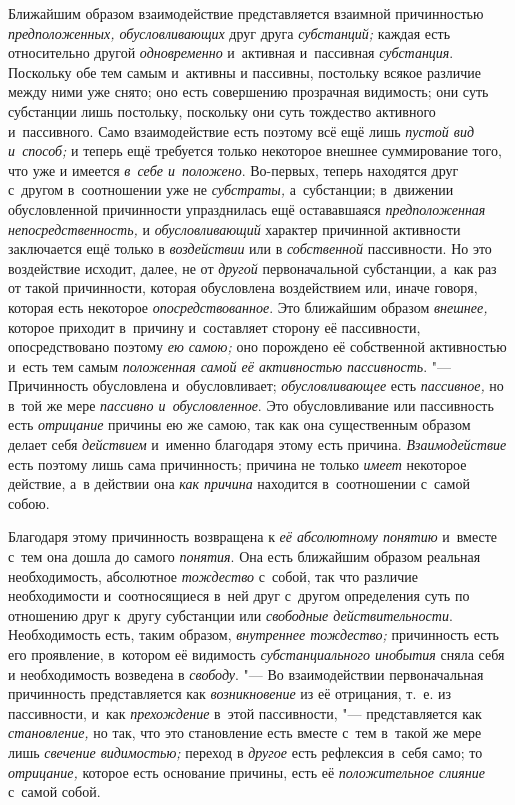 Ближайшим образом взаимодействие представляется взаимной причинностью
{\em предположенных, обусловливающих} друг друга
{\em субстанций;} каждая есть относительно другой
{\em одновременно} и~активная и~пассивная
{\em субстанция}. Поскольку обе тем самым и~активны и
пассивны, постольку всякое различие между ними уже снято; оно есть
совершению прозрачная видимость; они суть субстанции лишь постольку,
поскольку они суть тождество активного и~пассивного. Само взаимодействие
есть поэтому всё ещё лишь {\em пустой вид и~способ;} и
теперь ещё требуется только некоторое внешнее суммирование того, что уже и
имеется {\em в~себе и~положено}. Во-первых, теперь
находятся друг с~другом в~соотношении уже не
{\em субстраты,} а~субстанции; в~движении обусловленной
причинности упразднилась ещё остававшаяся
{\em предположенная непосредственность,} и
{\em обусловливающий} характер причинной активности
заключается ещё только в {\em воздействии} или в
{\em собственной} пассивности. Но это воздействие
исходит, далее, не от {\em другой} первоначальной
субстанции, а~как раз от такой причинности, которая обусловлена
воздействием или, иначе говоря, которая есть некоторое
{\em опосредствованное}. Это ближайшим образом
{\em внешнее,} которое приходит в~причину и~составляет
сторону её пассивности, опосредствовано поэтому {\em ею
самою;} оно порождено её собственной активностью и~есть тем самым
{\em положенная самой её активностью пассивность}. "---
Причинность обусловлена и~обусловливает; {\em обусловливающее} есть
{\em пассивное,} но в~той же мере
{\em пассивно и~обусловленное}. Это обусловливание или
пассивность есть {\em отрицание} причины ею же самою,
так как она существенным образом делает себя
{\em действием} и~именно благодаря этому есть причина.
{\em Взаимодействие} есть поэтому лишь сама
причинность; причина не только {\em имеет} некоторое
действие, а~в действии она {\em как причина} находится
в~соотношении с~самой собою.

Благодаря этому причинность возвращена к {\em её
абсолютному понятию} и~вместе с~тем она дошла до самого
{\em понятия}. Она есть ближайшим образом реальная
необходимость, абсолютное {\em тождество} с~собой, так
что различие необходимости и~соотносящиеся в~ней друг с~другом определения
суть по отношению друг к~другу субстанции или
{\em свободные действительности}. Необходимость есть,
таким образом, {\em внутреннее тождество;} причинность
есть его проявление, в~котором её видимость
{\em субстанциального инобытия} сняла себя и
необходимость возведена в {\em свободу}. "--- Во
взаимодействии первоначальная причинность представляется как
{\em возникновение} из её отрицания, т.~е. из
пассивности, и~как {\em прехождение} в~этой
пассивности, "--- представляется как {\em становление,} но
так, что это становление есть вместе с~тем в~такой же мере лишь
{\em свечение видимостью;} переход в
{\em другое} есть рефлексия в~себя само; то
{\em отрицание,} которое есть основание причины, есть
её {\em положительное слияние} с~самой собой.

